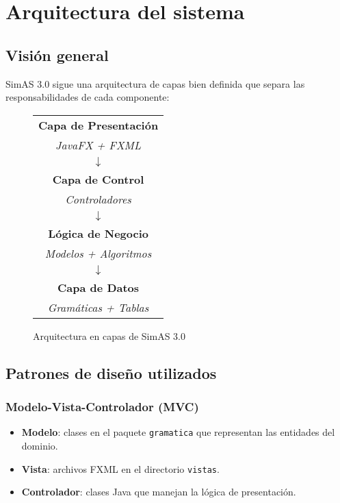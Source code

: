 \section{Arquitectura del sistema}

\subsection{Visión general}

SimAS 3.0 sigue una arquitectura de capas bien definida que separa las responsabilidades de cada componente:

\begin{figure}[H]
\centering
\begin{tabular}{|c|}
\hline
\textbf{Capa de Presentación} \\
\textit{JavaFX + FXML} \\
\hline
$\downarrow$ \\
\hline
\textbf{Capa de Control} \\
\textit{Controladores} \\
\hline
$\downarrow$ \\
\hline
\textbf{Lógica de Negocio} \\
\textit{Modelos + Algoritmos} \\
\hline
$\downarrow$ \\
\hline
\textbf{Capa de Datos} \\
\textit{Gramáticas + Tablas} \\
\hline
\end{tabular}
\caption{Arquitectura en capas de SimAS 3.0}
\label{fig:arquitectura-capas}
\end{figure}

\subsection{Patrones de diseño utilizados}

\subsubsection{Modelo-Vista-Controlador (MVC)}
\begin{itemize}
    \item \textbf{Modelo}: clases en el paquete \texttt{gramatica} que representan las entidades del dominio.
    \item \textbf{Vista}: archivos FXML en el directorio \texttt{vistas}.
    \item \textbf{Controlador}: clases Java que manejan la lógica de presentación.
\end{itemize}

